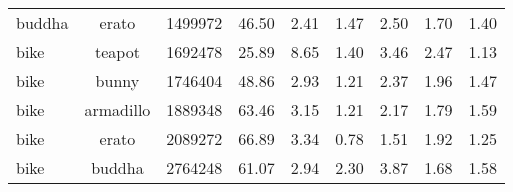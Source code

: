 \begin{table*}[!ht]
{\begin{tabular}{lcccccccc}
buddha & erato & 1499972 & 46.50 & 2.41 & 1.47 & 2.50 & 1.70 & 1.40 \\
bike & teapot & 1692478 & 25.89 & 8.65 & 1.40 & 3.46 & 2.47 & 1.13 \\
bike & bunny & 1746404 & 48.86 & 2.93 & 1.21 & 2.37 & 1.96 & 1.47 \\
bike & armadillo & 1889348 & 63.46 & 3.15 & 1.21 & 2.17 & 1.79 & 1.59 \\
bike & erato & 2089272 & 66.89 & 3.34 & 0.78 & 1.51 & 1.92 & 1.25 \\
bike & buddha & 2764248 & 61.07 & 2.94 & 2.30 & 3.87 & 1.68 & 1.58 \\
\bottomrule
\end{tabular}
  }
\end{table*}

